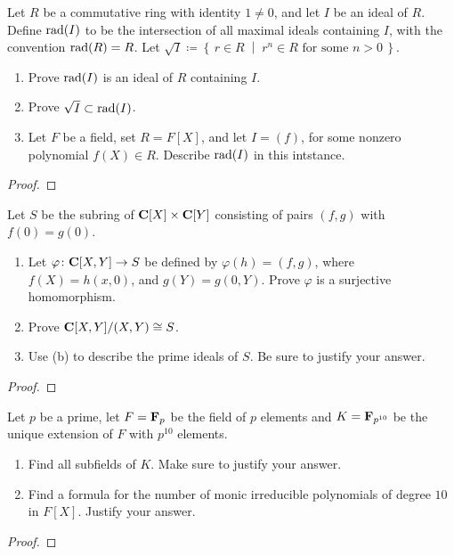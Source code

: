 \begin{problem}
Let $R$ be a commutative ring with identity $1\neq 0$, and let $I$ be an
ideal of $R$. Define $\operatorname{rad}(I)$ to be the intersection of all maximal ideals
containing $I$, with the convention $\operatorname{rad}(R)=R$. Let
$\sqrt{I}\coloneqq\left\{\,r\in R\;\middle|\;\text{$r^n\in R$ for some
    $n>0$}\,\right\}$.
\begin{enumerate}[label=(\alph*)]
\item Prove $\operatorname{rad}(I)$ is an ideal of $R$ containing $I$.
\item Prove $\sqrt{I}\subset\operatorname{rad}(I)$.
\item Let $F$ be a field, set $R=F[X]$, and let $I=(f)$, for some nonzero
  polynomial $f(X)\in R$. Describe $\operatorname{rad}(I)$ in this intstance.
\end{enumerate}
\end{problem}
\begin{proof}
\end{proof}

\begin{problem}
Let $S$ be the subring of $\mathbf{C}[X]\times\mathbf{C}[Y]$ consisting of pairs
$(f,g)$ with $f(0)=g(0)$.
\begin{enumerate}[label=(\alph*)]
\item Let $\varphi\colon\mathbf{C}[X,Y]\to S$ be defined by $\varphi(h)=(f,g)$,
  where $f(X)=h(x,0)$, and $g(Y)=g(0,Y)$. Prove $\varphi$ is a surjective
  homomorphism.
\item Prove $\mathbf{C}[X,Y]/(X,Y)\cong S$.
\item Use (b) to describe the prime ideals of $S$. Be sure to justify your
  answer.
\end{enumerate}
\end{problem}
\begin{proof}
\end{proof}

\begin{problem}
Let $p$ be a prime, let $F=\mathbf{F}_p$ be the field of $p$ elements and
$K=\mathbf{F}_{p^{10}}$ be the unique extension of $F$ with $p^{10}$ elements.
\begin{enumerate}[label=(\alph*)]
\item Find all subfields of $K$. Make sure to justify your answer.
\item Find a formula for the number of monic irreducible polynomials of
  degree $10$ in $F[X]$. Justify your answer.
\end{enumerate}
\end{problem}
\begin{proof}
\end{proof}

